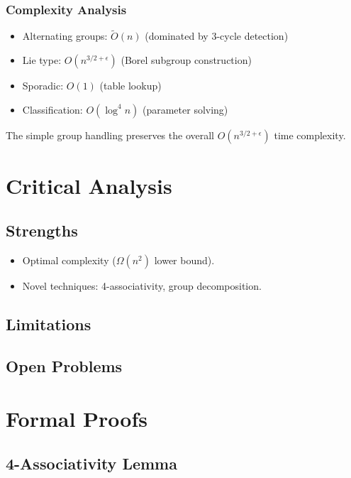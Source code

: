 \documentclass[sigconf]{acmart}
\begin{document}
\subsubsection{Complexity Analysis}
\begin{itemize}
    \item Alternating groups: $\widetilde{O}(n)$ (dominated by 3-cycle detection)
    \item Lie type: $O(n^{3/2+\epsilon})$ (Borel subgroup construction)
    \item Sporadic: $O(1)$ (table lookup)
    \item Classification: $O(\log^4 n)$ (parameter solving)
\end{itemize}

\begin{lemma}
The simple group handling preserves the overall $O(n^{3/2+\epsilon})$ time complexity.
\end{lemma}

\section{Critical Analysis}
\subsection{Strengths}
\begin{itemize}
    \item Optimal complexity (\( \Omega(n^2) \) lower bound).
    \item Novel techniques: 4-associativity, group decomposition.
\end{itemize}

\subsection{Limitations}

\subsection{Open Problems}

\section{Formal Proofs}
\subsection{4-Associativity Lemma}
\end{document}
